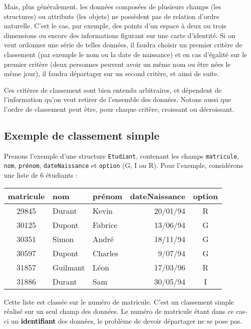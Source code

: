 	Mais, plus généralement, les données composées de plusieurs
	champs (les structures) ou attributs (les objets)
	ne possèdent pas de relation d’ordre naturelle. 
	C'est le cas, par exemple, des points d’un espace à deux ou trois dimensions
	ou encore des informations figurant sur une carte d’identité. 
	Si on veut ordonner une série de telles données, 
	il faudra choisir un premier critère de classement 
	(par exemple le nom ou la date de naissance) 
	et en cas d’égalité sur le premier critère 
	(deux personnes peuvent avoir un même nom ou être nées le même jour), 
	il faudra départager sur un second critère, 
	et ainsi de suite.
	
	Ces critères de classement sont bien entendu arbitraires, 
	et dépendent de l’information qu’on veut retirer de l’ensemble des données. 
	Notons aussi que l’ordre de classement peut être, pour chaque critère, 
	croissant ou décroissant.

\subsection*{Exemple de classement simple}

	Prenons l’exemple d’une structure \texttt{Etudiant}, 
	contenant les champs \texttt{matricule}, \texttt{nom}, \texttt{prénom}, 
	\texttt{dateNaissance} et \texttt{option} (G, I ou R). 
	Pour l’exemple, considérons une liste de 6 étudiants :
	
	\begin{center}
	\small\sffamily
	\begin{tabular}{cllrc}
		matricule 	& nom 		& prénom 	& dateNaissance & option \\
		\hline 
		29845     	& Durant 	& Kevin 	& 20/01/94 		& R\\
		30125 		& Dupont	& Fabrice 	& 13/06/94 		& G\\
		30351 		& Simon 	& André 	& 18/11/94 		& G\\
		30597 		& Dupont 	& Charles 	& 9/07/94 		& G\\
		31857 		& Guilmant  & Léon 		& 17/03/96 		& R\\
		31886 		& Durant  	& Sam 		& 30/05/94 		& I\\
		\hline 
	\end{tabular}
	\end{center}
	
	Cette liste est classée sur le numéro de matricule. C’est un classement
	simple réalisé sur un seul champ des données. Le numéro de matricule
	étant dans ce cas-ci un \textbf{\textcolor{black}{identifiant}} des
	données, le problème de devoir départager ne se pose pas.

